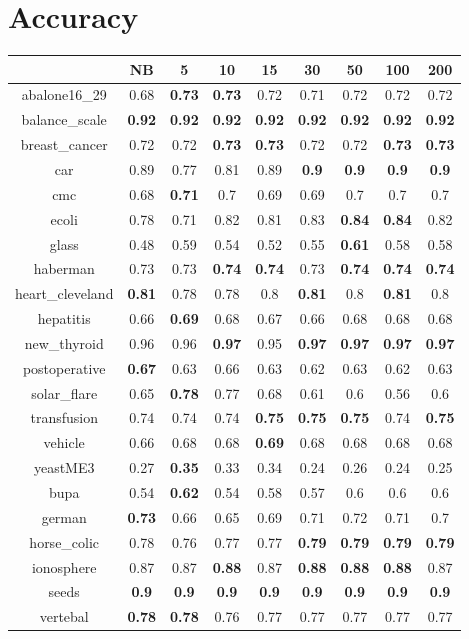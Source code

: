 \documentclass{article}%
\begin{document}
%
\normalsize%
\section*{Accuracy}%
\begin{tabular}{c|cccccccc}%
\hline%
&NB&5&10&15&30&50&100&200\\%
\hline%
abalone16\_29&0.68&\textbf{0.73}&\textbf{0.73}&0.72&0.71&0.72&0.72&0.72\\%
\hline%
balance\_scale&\textbf{0.92}&\textbf{0.92}&\textbf{0.92}&\textbf{0.92}&\textbf{0.92}&\textbf{0.92}&\textbf{0.92}&\textbf{0.92}\\%
\hline%
breast\_cancer&0.72&0.72&\textbf{0.73}&\textbf{0.73}&0.72&0.72&\textbf{0.73}&\textbf{0.73}\\%
\hline%
car&0.89&0.77&0.81&0.89&\textbf{0.9}&\textbf{0.9}&\textbf{0.9}&\textbf{0.9}\\%
\hline%
cmc&0.68&\textbf{0.71}&0.7&0.69&0.69&0.7&0.7&0.7\\%
\hline%
ecoli&0.78&0.71&0.82&0.81&0.83&\textbf{0.84}&\textbf{0.84}&0.82\\%
\hline%
glass&0.48&0.59&0.54&0.52&0.55&\textbf{0.61}&0.58&0.58\\%
\hline%
haberman&0.73&0.73&\textbf{0.74}&\textbf{0.74}&0.73&\textbf{0.74}&\textbf{0.74}&\textbf{0.74}\\%
\hline%
heart\_cleveland&\textbf{0.81}&0.78&0.78&0.8&\textbf{0.81}&0.8&\textbf{0.81}&0.8\\%
\hline%
hepatitis&0.66&\textbf{0.69}&0.68&0.67&0.66&0.68&0.68&0.68\\%
\hline%
new\_thyroid&0.96&0.96&\textbf{0.97}&0.95&\textbf{0.97}&\textbf{0.97}&\textbf{0.97}&\textbf{0.97}\\%
\hline%
postoperative&\textbf{0.67}&0.63&0.66&0.63&0.62&0.63&0.62&0.63\\%
\hline%
solar\_flare&0.65&\textbf{0.78}&0.77&0.68&0.61&0.6&0.56&0.6\\%
\hline%
transfusion&0.74&0.74&0.74&\textbf{0.75}&\textbf{0.75}&\textbf{0.75}&0.74&\textbf{0.75}\\%
\hline%
vehicle&0.66&0.68&0.68&\textbf{0.69}&0.68&0.68&0.68&0.68\\%
\hline%
yeastME3&0.27&\textbf{0.35}&0.33&0.34&0.24&0.26&0.24&0.25\\%
\hline%
bupa&0.54&\textbf{0.62}&0.54&0.58&0.57&0.6&0.6&0.6\\%
\hline%
german&\textbf{0.73}&0.66&0.65&0.69&0.71&0.72&0.71&0.7\\%
\hline%
horse\_colic&0.78&0.76&0.77&0.77&\textbf{0.79}&\textbf{0.79}&\textbf{0.79}&\textbf{0.79}\\%
\hline%
ionosphere&0.87&0.87&\textbf{0.88}&0.87&\textbf{0.88}&\textbf{0.88}&\textbf{0.88}&0.87\\%
\hline%
seeds&\textbf{0.9}&\textbf{0.9}&\textbf{0.9}&\textbf{0.9}&\textbf{0.9}&\textbf{0.9}&\textbf{0.9}&\textbf{0.9}\\%
\hline%
vertebal&\textbf{0.78}&\textbf{0.78}&0.76&0.77&0.77&0.77&0.77&0.77\\%
\hline%
\end{tabular}
\end{document}
